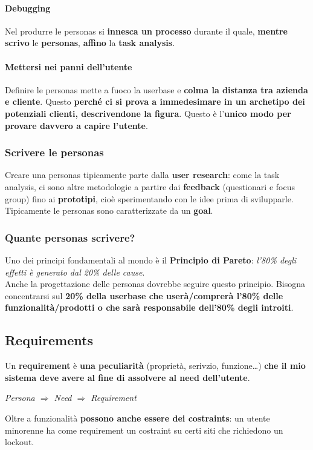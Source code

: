 \documentclass[10pt]{article}
\begin{document}
\paragraph{Debugging} Nel produrre le personas si \textbf{innesca un processo} durante il quale, \textbf{mentre scrivo} le \textbf{personas}, \textbf{affino} la \textbf{task analysis}.
\paragraph{Mettersi nei panni dell'utente} Definire le personas mette a fuoco la userbase e \textbf{colma la distanza tra azienda e cliente}. Questo \textbf{perché ci si prova a immedesimare in un archetipo dei potenziali clienti, descrivendone la figura}. Questo è l'\textbf{unico modo per provare davvero a capire l'utente}.
\subsubsection{Scrivere le personas} Creare una personas tipicamente parte dalla \textbf{user research}: come la task analysis, ci sono altre metodologie a partire dai \textbf{feedback} (questionari e focus group) fino ai \textbf{prototipi}, cioè sperimentando con le idee prima di svilupparle. Tipicamente le personas sono caratterizzate da un \textbf{goal}.
\subsubsection{Quante personas scrivere?} Uno dei principi fondamentali al mondo è il \textbf{Principio di Pareto}: \textit{l'80\% degli effetti è generato dal 20\% delle cause}.\\
Anche la progettazione delle personas dovrebbe seguire questo principio. Bisogna concentrarsi sul \textbf{20\% della userbase che userà/comprerà l'80\% delle funzionalità/prodotti o che sarà responsabile dell'80\% degli introiti}.
\subsection{Requirements}
Un \textbf{requirement} è \textbf{una peculiarità} (proprietà, serivzio, funzione\ldots) \textbf{che il mio sistema deve avere al fine di assolvere al need dell'utente}.
\begin{center}
\emph{Persona $\Rightarrow$ Need $\Rightarrow$ Requirement}
\end{center}
Oltre a funzionalità \textbf{possono anche essere dei costraints}: un utente minorenne ha come requirement un costraint su certi siti che richiedono un lockout.
\end{document}
